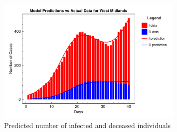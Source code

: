 \documentclass[12pt]{article}
\begin{document}
\begin{figure}[h]
    \centering
    \includegraphics[width=0.8\textwidth]{images/ude/West Midlands_infected_death_data.pdf}
    \caption{Predicted number of infected and deceased individuals}
    \label{fig:ude_West Midlands}
\end{figure}
\end{document}
